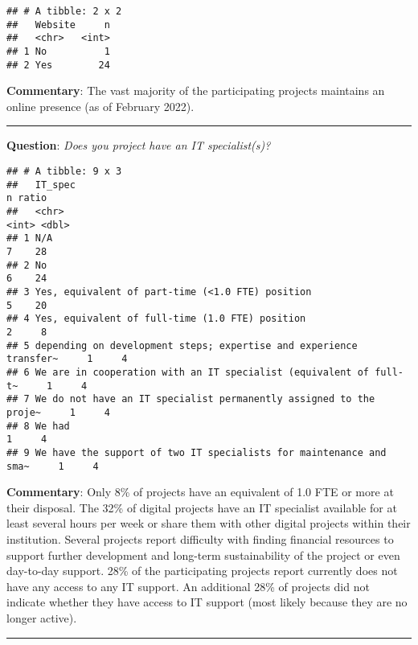 \documentclass[
]{article}
\begin{document}
\begin{verbatim}
## # A tibble: 2 x 2
##   Website     n
##   <chr>   <int>
## 1 No          1
## 2 Yes        24
\end{verbatim}

\textbf{Commentary}: The vast majority of the participating projects
maintains an online presence (as of February 2022).

\begin{center}\rule{0.5\linewidth}{0.5pt}\end{center}

\textbf{Question}: \emph{Does you project have an IT specialist(s)?}

\begin{verbatim}
## # A tibble: 9 x 3
##   IT_spec                                                                n ratio
##   <chr>                                                              <int> <dbl>
## 1 N/A                                                                    7    28
## 2 No                                                                     6    24
## 3 Yes, equivalent of part-time (<1.0 FTE) position                       5    20
## 4 Yes, equivalent of full-time (1.0 FTE) position                        2     8
## 5 depending on development steps; expertise and experience transfer~     1     4
## 6 We are in cooperation with an IT specialist (equivalent of full-t~     1     4
## 7 We do not have an IT specialist permanently assigned to the proje~     1     4
## 8 We had                                                                 1     4
## 9 We have the support of two IT specialists for maintenance and sma~     1     4
\end{verbatim}

\textbf{Commentary}: Only 8\% of projects have an equivalent of 1.0 FTE
or more at their disposal. The 32\% of digital projects have an IT
specialist available for at least several hours per week or share them
with other digital projects within their institution. Several projects
report difficulty with finding financial resources to support further
development and long-term sustainability of the project or even
day-to-day support. 28\% of the participating projects report currently
does not have any access to any IT support. An additional 28\% of
projects did not indicate whether they have access to IT support (most
likely because they are no longer active).

\begin{center}\rule{0.5\linewidth}{0.5pt}\end{center}
\end{document}
